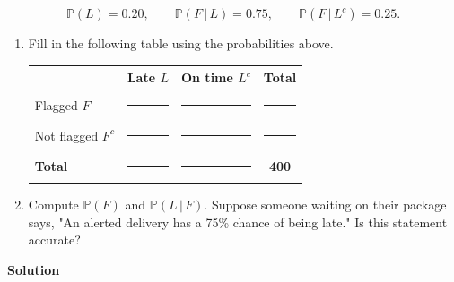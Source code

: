 \documentclass[11pt,letterpaper]{article}
\newcommand{\blocktitle}[1]{\par\addvspace{9pt}\noindent\textbf{#1}\par\nopagebreak\vspace{2pt}\nopagebreak}
\newcommand{\blank}{\rule{1.4em}{0.35pt}}
\begin{document}
\[
\mathbb P(L) = 0.20, \qquad \mathbb P(F \,|\, L) = 0.75, \qquad \mathbb P(F \,|\, L^c) = 0.25.
\]

\begin{enumerate}[label=\alph*.]

\item \begin{minipage}[t]{\linewidth}
Fill in the following table using the probabilities above.
\begin{center}
\small
\begin{tabular}{|l|c|c|c|}
\hline
 & \textbf{Late $L$} & \textbf{On time $L^c$} & \textbf{Total} \\ \hline
Flagged $F$ & \blank & \blank & \blank \\ \hline
Not flagged $F^c$ & \blank & \blank & \blank \\ \hline
\textbf{Total} & \blank & \blank & \textbf{400} \\ \hline
\end{tabular}
\end{center}
\end{minipage}

\item Compute $\mathbb P(F)$ and $\mathbb P(L \,|\, F)$. Suppose someone waiting on their package says, "An alerted delivery has a 75\% chance of being late." Is this statement accurate?

\end{enumerate}

\blocktitle{Solution}
\end{document}
